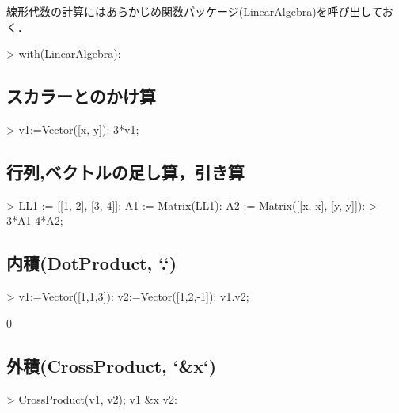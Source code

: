 線形代数の計算にはあらかじめ関数パッケージ(LinearAlgebra)を呼び出しておく．
\begin{MapleInput}
> with(LinearAlgebra):
\end{MapleInput}

\subsection{スカラーとのかけ算}

\begin{MapleInput}
> v1:=Vector([x, y]): 3*v1;
\end{MapleInput}
\begin{MapleOutput}
\left[ \begin {array}{c} 3\,x\\ 3\,y\end {array} \right]
\end{MapleOutput}

\subsection{行列,ベクトルの足し算，引き算}
\begin{MapleInput}
> LL1 := [[1, 2], [3, 4]]: A1 := Matrix(LL1): A2 := Matrix([[x, x], [y, y]]):
> 3*A1-4*A2;
\end{MapleInput}
\begin{MapleOutput}
\left[ \begin {array}{cc} 3-4\,x&6-4\,x\\ 9-4\,y&12-4\,y\end {array} \right] 
\end{MapleOutput}

\subsection{内積(DotProduct, `.`)}
\begin{MapleInput}
> v1:=Vector([1,1,3]): v2:=Vector([1,2,-1]): v1.v2;
\end{MapleInput}
\begin{MapleOutput}
                                      0
\end{MapleOutput}
\subsection{外積(CrossProduct, `\&x`)}
\begin{MapleInput}
> CrossProduct(v1, v2); v1 &x v2:
\end{MapleInput}
\begin{MapleOutput}
\left[ \begin {array}{c} -7\\ 4\\ 1\end {array} \right] 
\end{MapleOutput}

